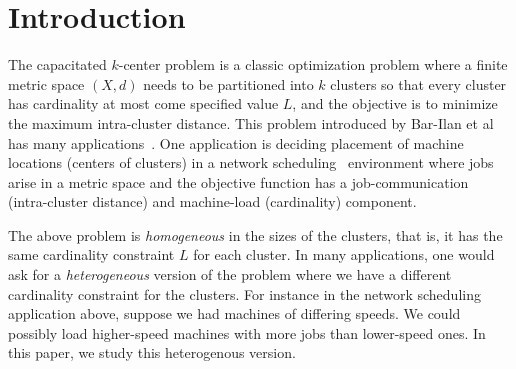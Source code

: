 \section{Introduction}
The capacitated $k$-center problem is a classic optimization problem where a finite metric space $(X,d)$ needs to be partitioned into $k$ clusters so that  every  cluster has cardinality at most
come specified value $L$, and the objective is to minimize the maximum intra-cluster distance. This problem introduced by Bar-Ilan et al~\cite{bar-ilan kotsarz peleg 1993} has many applications~\cite{lupton maley yong, morgan levin, murthy kam}. %
One application is deciding placement of machine locations (centers of clusters) in a network scheduling~\cite{PSW97} environment where jobs arise in a metric space and the objective function has a  job-communication (intra-cluster distance) and machine-load (cardinality) 
component. %

The above problem is {\em homogeneous} in the sizes of the clusters, that is, it has the same cardinality constraint $L$ for each cluster. In many applications, one would ask for a \emph{heterogeneous} version of the problem where we have a different cardinality constraint for the clusters.
For instance in the network scheduling application above, suppose we had machines of differing speeds. We could possibly load higher-speed machines with more jobs than lower-speed ones. In this paper, we study  this heterogenous version.

